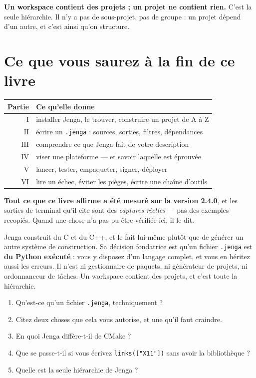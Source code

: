 \begin{nkretenir}
\textbf{Un workspace contient des projets ; un projet ne contient rien.} C'est la
seule hiérarchie. Il n'y a pas de sous-projet, pas de groupe : un projet dépend
d'un autre, et c'est ainsi qu'on structure.
\end{nkretenir}

\section{Ce que vous saurez à la fin de ce livre}

\begin{center}
\begin{tabular}{@{}rl@{}}
\toprule
\textbf{Partie} & \textbf{Ce qu'elle donne} \\
\midrule
I & installer Jenga, le trouver, construire un projet de A à Z \\
II & écrire un \texttt{.jenga} : sources, sorties, filtres, dépendances \\
III & comprendre ce que Jenga fait de votre description \\
IV & viser une plateforme --- et savoir laquelle est éprouvée \\
V & lancer, tester, empaqueter, signer, déployer \\
VI & lire un échec, éviter les pièges, écrire une chaîne d'outils \\
\bottomrule
\end{tabular}
\end{center}

\begin{nkretenir}
\textbf{Tout ce que ce livre affirme a été mesuré sur la version 2.4.0}, et les
sorties de terminal qu'il cite sont des \emph{captures réelles} --- pas des
exemples recopiés. Quand une chose n'a pas pu être vérifiée ici, il le dit.
\end{nkretenir}

\begin{nkbilan}
Jenga construit du C et du C++, et le fait lui-même plutôt que de générer un
autre système de construction. Sa décision fondatrice est qu'un fichier
\texttt{.jenga} est \textbf{du Python exécuté} : vous y disposez d'un langage
complet, et vous en héritez aussi les erreurs. Il n'est ni gestionnaire de
paquets, ni générateur de projets, ni ordonnanceur de tâches. Un workspace
contient des projets, et c'est toute la hiérarchie.
\end{nkbilan}

\begin{nkquestions}
\begin{enumerate}
\item Qu'est-ce qu'un fichier \texttt{.jenga}, techniquement ?
\item Citez deux choses que cela vous autorise, et une qu'il faut craindre.
\item En quoi Jenga diffère-t-il de CMake ?
\item Que se passe-t-il si vous écrivez \texttt{links(["X11"])} sans avoir la
      bibliothèque ?
\item Quelle est la seule hiérarchie de Jenga ?
\end{enumerate}
\end{nkquestions}

